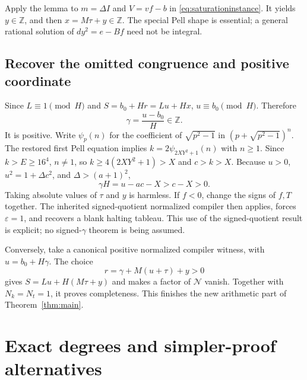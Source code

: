 \documentclass[11pt,a4paper]{article}
\theoremstyle{remark}\newtheorem{remark}[theorem]{Remark}
\newcommand{\ZZ}{\mathbb Z}
\begin{document}
Apply the lemma to $m=\Delta I$ and $V=vf-b$ in
\eqref{eq:saturationinstance}. It yields $y\in\ZZ$, and then
$x=M\tau+y\in\ZZ$. The special Pell shape is essential; a general
rational solution of $dy^2=e-Bf$ need not be integral.

\subsection{Recover the omitted congruence and positive coordinate}

Since $L\equiv1\pmod H$ and $S=b_0+Hr=Lu+Hx$,
$u\equiv b_0\pmod H$. Therefore
\[
 \gamma=\frac{u-b_0}{H}\in\ZZ.
\]
It is positive. Write $\psi_p(n)$ for the coefficient of
$\sqrt{p^2-1}$ in $(p+\sqrt{p^2-1})^n$.
The restored first Pell equation implies
$k=2\psi_{2XY^2+1}(n)$ with $n\ge1$. Since $k>E\ge16^4$,
$n\ne1$, so $k\ge4(2XY^2+1)>X$ and $c>k>X$.
Because $u>0$, $u^2=1+\Delta c^2$, and $\Delta>(a+1)^2$,
\[
 \gamma H=u-ac-X>c-X>0.
\]
Taking absolute values of $\tau$ and $y$ is harmless. If $f<0$, change
the signs of $f,T$ together. The inherited signed-quotient normalized
compiler then applies, forces $\varepsilon=1$, and recovers a blank
halting tableau. This use of the signed-quotient result is explicit;
no signed-$\gamma$ theorem is being assumed.

Conversely, take a canonical positive normalized compiler witness, with
$u=b_0+H\gamma$. The choice
\begin{equation}
 r=\gamma+M(u+\tau)+y>0\label{eq:extension}
\end{equation}
gives $S=Lu+H(M\tau+y)$ and makes a factor of $\mathcal N$ vanish.
Together with $N_k=N_t=1$, it proves completeness. This finishes the new
arithmetic part of Theorem~\ref{thm:main}.

\section{Exact degrees and simpler-proof alternatives}
\label{sec:degree}
\end{document}
